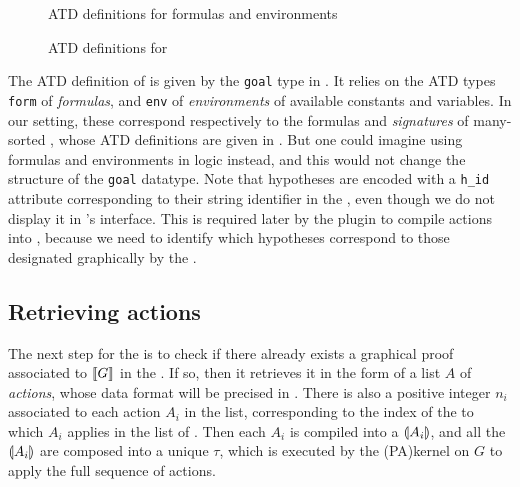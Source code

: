 \begin{figure}
  
  \caption{ATD definitions for  formulas and environments}
\end{figure}

\begin{figure}
  
  \caption{ATD definitions for }
\end{figure}

The ATD definition of  is given by the \texttt{goal} type in
. It relies on
the ATD types \texttt{form} of \emph{formulas}, and \texttt{env} of
\emph{environments} of available constants and variables. In our setting, these
correspond respectively to the formulas and \emph{signatures} of many-sorted
, whose ATD definitions are given in . But one
could imagine using formulas and environments in  logic instead, and
this would not change the structure of the \texttt{goal} datatype. Note that
hypotheses are encoded with a \texttt{h\_id} attribute corresponding to their
string identifier in the  , even though we do not display it in 's
interface. This is required later by the plugin to compile actions into ,
because we need to identify which  hypotheses correspond to those designated
graphically by the .

\subsection{Retrieving actions}

The next step for the  is to check if there already exists a
graphical proof associated to $\llbracket G \rrbracket$ in the . If so,
then it retrieves it in the form of a list $A$ of \emph{actions}, whose data
format will be precised in . There is also a positive
integer $n_i$ associated to each action $A_i$ in the list, corresponding to the
index of the  to which $A_i$ applies in the list of . Then each
$A_i$ is compiled into a  $\llparenthesis A_i \rrparenthesis$, and all the $\llparenthesis A_i \rrparenthesis$
are composed into a unique  $\tau$, which is executed by the
\kl(PA){kernel} on $G$ to apply the full sequence of actions.

